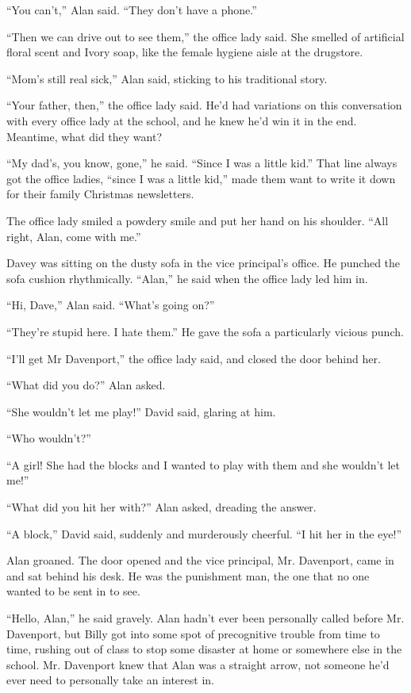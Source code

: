 ``You can't,'' Alan said.  ``They don't have a phone.''

``Then we can drive out to see them,'' the office lady said.  She
smelled of artificial floral scent and Ivory soap, like the female
hygiene aisle at the drugstore.

``Mom's still real sick,'' Alan said, sticking to his traditional
story.

``Your father, then,'' the office lady said.  He'd had variations on
this conversation with every office lady at the school, and he knew
he'd win it in the end.  Meantime, what did they want?

``My dad's, you know, gone,'' he said.  ``Since I was a little kid.''
That line always got the office ladies, ``since I was a little kid,''
made them want to write it down for their family Christmas
newsletters.

The office lady smiled a powdery smile and put her hand on his
shoulder.  ``All right, Alan, come with me.''

Davey was sitting on the dusty sofa in the vice principal's office. 
He punched the sofa cushion rhythmically.  ``Alan,'' he said when the
office lady led him in.

``Hi, Dave,'' Alan said.  ``What's going on?''

``They're stupid here.  I hate them.'' He gave the sofa a particularly
vicious punch.

``I'll get Mr Davenport,'' the office lady said, and closed the door
behind her.

``What did you do?'' Alan asked.

``She wouldn't let me play!'' David said, glaring at him.

``Who wouldn't?''

``A girl!  She had the blocks and I wanted to play with them and she
wouldn't let me!''

``What did you hit her with?'' Alan asked, dreading the answer.

``A block,'' David said, suddenly and murderously cheerful.  ``I hit
her in the eye!''

Alan groaned.  The door opened and the vice principal, Mr.  Davenport,
came in and sat behind his desk.  He was the punishment man, the one
that no one wanted to be sent in to see.

``Hello, Alan,'' he said gravely.  Alan hadn't ever been personally
called before Mr.  Davenport, but Billy got into some spot of
precognitive trouble from time to time, rushing out of class to stop
some disaster at home or somewhere else in the school.  Mr.  Davenport
knew that Alan was a straight arrow, not someone he'd ever need to
personally take an interest in.


